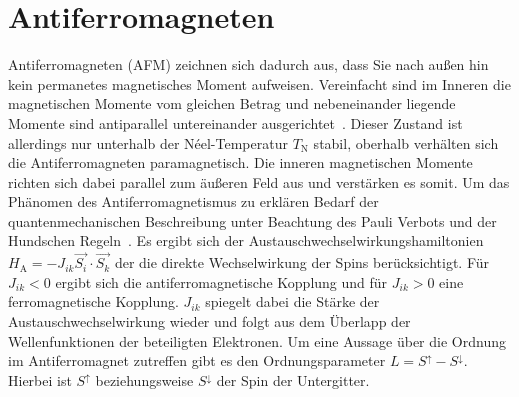     
    \section{Antiferromagneten} \label{sec:AFM}
        Antiferromagneten (AFM) zeichnen sich dadurch aus, dass Sie nach außen hin kein permanetes magnetisches Moment aufweisen.
        Vereinfacht sind im Inneren die magnetischen Momente vom gleichen Betrag und nebeneinander liegende Momente sind antiparallel untereinander ausgerichtet~\cite{Suter}.
        Dieser Zustand ist allerdings nur unterhalb der Néel-Temperatur $T_\text{N}$ stabil, oberhalb verhälten sich die Antiferromagneten paramagnetisch.
        Die inneren magnetischen Momente richten sich dabei parallel zum äußeren Feld aus und verstärken es somit.
        Um das Phänomen des Antiferromagnetismus zu erklären Bedarf der quantenmechanischen Beschreibung unter Beachtung des Pauli Verbots und der Hundschen Regeln~\cite{TUChemnitz}.
        Es ergibt sich der Austauschwechselwirkungshamiltonien $H_\text{A} = - J_{ik} \vec{S_i}\cdot\vec{S_k}$ der die direkte Wechselwirkung der Spins berücksichtigt.
        Für $J_{ik} < 0$ ergibt sich die antiferromagnetische Kopplung und für $J_{ik} > 0$ eine ferromagnetische Kopplung.
        $J_{ik}$ spiegelt dabei die Stärke der Austauschwechselwirkung wieder und folgt aus dem Überlapp der Wellenfunktionen der beteiligten Elektronen.
        Um eine Aussage über die Ordnung im Antiferromagnet zutreffen gibt es den Ordnungsparameter $L = S^{\uparrow} - S^{\downarrow}$.
        Hierbei ist $S^{\uparrow}$ beziehungsweise $S^{\downarrow}$ der Spin der Untergitter.

